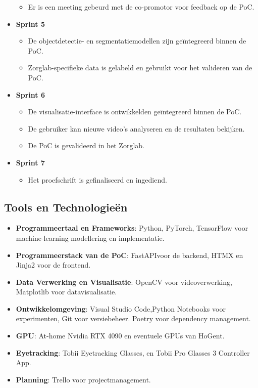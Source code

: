 \begin{itemize}
\begin{itemize}
            \item Er is een meeting gebeurd met de co-promotor voor feedback op de PoC.
        \end{itemize}
    \item \textbf{Sprint 5}
        \begin{itemize}
            \item De objectdetectie- en segmentatiemodellen zijn geïntegreerd binnen de PoC.
            \item Zorglab-specifieke data is gelabeld en gebruikt voor het valideren van de PoC.
        \end{itemize}
    \item \textbf{Sprint 6}
        \begin{itemize}
            \item De visualisatie-interface is ontwikkeld\newline en geïntegreerd binnen de PoC.
            \item De gebruiker kan nieuwe video's analyseren en de resultaten bekijken.
            \item De PoC is gevalideerd in het Zorglab.
        \end{itemize}
    \item \textbf{Sprint 7}
        \begin{itemize}
            \item Het proefschrift is gefinaliseerd en ingediend.
        \end{itemize}
\end{itemize}

\subsection{Tools en Technologieën}

\begin{itemize} 
  \item \textbf{Programmeertaal en Frameworks}: Python, PyTorch, TensorFlow voor machine-learning modellering en implementatie. 
  \item \textbf{Programmeerstack van de PoC}: FastAPI\newline voor de backend, HTMX en Jinja2 voor de frontend.
  \item \textbf{Data Verwerking en Visualisatie}: OpenCV voor videoverwerking, Matplotlib voor datavisualisatie. 
  \item \textbf{Ontwikkelomgeving}: Visual Studio Code,\newline Python Notebooks voor experimenten, Git voor versiebeheer. Poetry voor dependency management.
  \item \textbf{GPU}: At-home Nvidia RTX 4090 en eventuele GPUs van HoGent.
  \item \textbf{Eyetracking}: Tobii Eyetracking Glasses, en Tobii Pro Glasses 3 Controller App.
  \item \textbf{Planning}: Trello voor projectmanagement.
\end{itemize}

